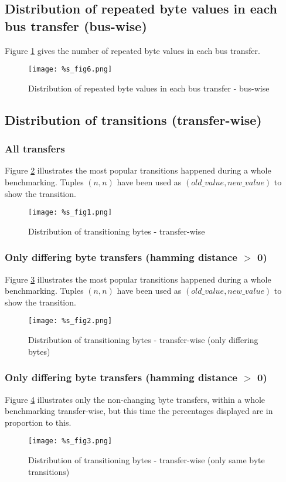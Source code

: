 \documentclass[a4paper,12pt]{article}
\begin{document}
\pagebreak
\subsection{Distribution of repeated byte values in each bus transfer (bus-wise)}
Figure \ref{fig_3} gives the number of repeated byte values in each bus transfer.

\begin{figure}[H]
		\centering
		\texttt{[image: \%s\_fig6.png]}
		\caption{Distribution of repeated byte values in each bus transfer - bus-wise}
		\label{fig_3}
\end{figure}	

\subsection{Distribution of transitions (transfer-wise)}
\subsubsection{All transfers}
Figure \ref{fig_4} illustrates the most popular transitions happened during a whole benchmarking. Tuples $(n,n)$ have been used as $(old\_value, new\_value)$ to show the transition.

\begin{figure}[H]
		\centering
		\texttt{[image: \%s\_fig1.png]}
		\caption{Distribution of transitioning bytes - transfer-wise}
		\label{fig_4}
\end{figure}	

\subsubsection{Only differing byte transfers (hamming distance $>$ 0)}
Figure \ref{fig_5} illustrates the most popular transitions happened during a whole benchmarking. Tuples $(n,n)$ have been used as $(old\_value, new\_value)$ to show the transition.

\begin{figure}[H]
		\centering
		\texttt{[image: \%s\_fig2.png]}
		\caption{Distribution of transitioning bytes - transfer-wise (only differing bytes)}
		\label{fig_5}
\end{figure}	

\subsubsection{Only differing byte transfers (hamming distance $>$ 0)}
Figure \ref{fig_6} illustrates only the non-changing byte transfers, within a whole benchmarking transfer-wise, but this time the percentages displayed are in proportion to this.

\begin{figure}[H]
		\centering
		\texttt{[image: \%s\_fig3.png]}
		\caption{Distribution of transitioning bytes - transfer-wise (only same byte transitions)}
		\label{fig_6}
\end{figure}	
\end{document}
